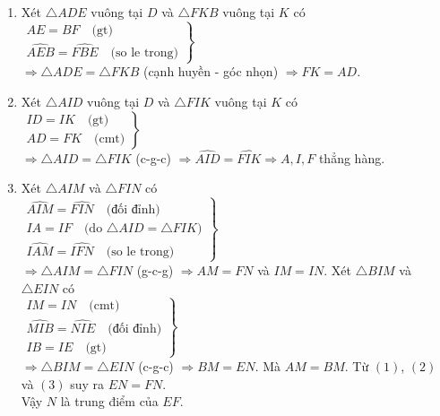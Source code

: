 \begin{vd}
{\begin{enumerate}
{
}
\item Xét $\triangle ADE$ vuông tại $D$ và $\triangle FKB$ vuông tại $K$ có\\
$\left. 
\begin{array}{l}
AE=BF \quad \text{(gt)}\\ 
\widehat{AEB}=\widehat{FBE} \quad \text{(so le trong)}
\end{array} 
\right\}$\\
$\Rightarrow \triangle ADE=\triangle FKB$ (cạnh huyền - góc nhọn) $\Rightarrow FK=AD$.
\item Xét $\triangle AID$ vuông tại $D$ và $\triangle FIK$ vuông tại $K$ có\\
$\left. 
\begin{array}{l}
ID=IK \quad \text{(gt)}\\ 
AD=FK \quad \text{(cmt)}
\end{array} 
\right\}$\\
$\Rightarrow \triangle AID=\triangle FIK$ (c-g-c) $\Rightarrow \widehat{AID}=\widehat{FIK}\Rightarrow A, I, F$ thẳng hàng.
\item Xét $\triangle AIM$ và $\triangle FIN$ có\\
$\left. 
\begin{array}{l} 
\widehat{AIM}=\widehat{FIN} \quad \text{(đối đỉnh)}\\
IA=IF \quad \text{(do } \triangle AID=\triangle FIK)\\
\widehat{IAM}=\widehat{IFN} \quad \text{(so le trong)}
\end{array} 
\right\}$\\
$\Rightarrow \triangle AIM=\triangle FIN$ (g-c-g) $\Rightarrow AM=FN$ và $IM=IN$.  
Xét $\triangle BIM$ và $\triangle EIN$ có\\
$\left. 
\begin{array}{l} 
IM=IN \quad \text{(cmt)}\\
\widehat{MIB}=\widehat{NIE} \quad \text{(đối đỉnh)}\\
IB=IE \quad \text{(gt)}
\end{array} 
\right\}$\\
$\Rightarrow \triangle BIM=\triangle EIN$ (c-g-c) $\Rightarrow BM=EN$. 
Mà $AM=BM$. 
Từ $(1)$, $(2)$ và $(3)$ suy ra $EN=FN$.\\
Vậy $N$ là trung điểm của $EF$.
\end{enumerate}
}
\end{vd}


